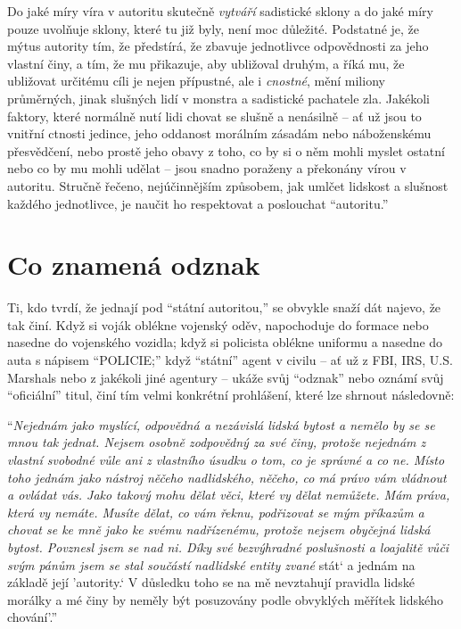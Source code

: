 \documentclass{book}
\begin{document}
Do jaké míry víra v autoritu skutečně \emph{vytváří} sadistické sklony a do jaké míry pouze uvolňuje sklony, které tu již byly, není moc důležité. Podstatné je, že mýtus autority tím, že předstírá, že zbavuje jednotlivce odpovědnosti za jeho vlastní činy, a tím, že mu přikazuje, aby ubližoval druhým, a říká mu, že ubližovat určitému cíli je nejen přípustné, ale i \emph{cnostné}, mění miliony průměrných, jinak slušných lidí v monstra a sadistické pachatele zla. Jakékoli faktory, které normálně nutí lidi chovat se slušně a nenásilně -- ať už jsou to vnitřní ctnosti jedince, jeho oddanost morálním zásadám nebo náboženskému přesvědčení, nebo prostě jeho obavy z toho, co by si o něm mohli myslet ostatní nebo co by mu mohli udělat -- jsou snadno poraženy a překonány vírou v autoritu. Stručně řečeno, nejúčinnějším způsobem, jak umlčet lidskost a slušnost každého jednotlivce, je naučit ho respektovat a poslouchat \enquote{autoritu.}

\section{Co znamená odznak}

Ti, kdo tvrdí, že jednají pod \enquote{státní autoritou,} se obvykle snaží dát najevo, že tak činí. Když si voják oblékne vojenský oděv, napochoduje do formace nebo nasedne do vojenského vozidla; když si policista oblékne uniformu a nasedne do auta s nápisem \enquote{POLICIE;} když \enquote{státní} agent v civilu -- ať už z FBI, IRS, U.S. Marshals nebo z jakékoli jiné agentury -- ukáže svůj \enquote{odznak} nebo oznámí svůj \enquote{oficiální} titul, činí tím velmi konkrétní prohlášení, které lze shrnout následovně:

\enquote{\emph{Nejednám jako myslící, odpovědná a nezávislá lidská bytost a nemělo by se se mnou tak jednat. Nejsem osobně zodpovědný za své činy, protože nejednám z vlastní svobodné vůle ani z vlastního úsudku o tom, co je správné a co ne. Místo toho jednám jako nástroj něčeho nadlidského, něčeho, co má právo vám vládnout a ovládat vás. Jako takový mohu dělat věci, které vy dělat nemůžete. Mám práva, která vy nemáte. Musíte dělat, co vám řeknu, podřizovat se mým příkazům a chovat se ke mně jako ke svému nadřízenému, protože nejsem obyčejná lidská bytost. Povznesl jsem se nad ni. Díky své bezvýhradné poslušnosti a loajalitě vůči svým pánům jsem se stal součástí nadlidské entity zvané }stát\enquote{ a jednám na základě její }autority.\enquote{ V důsledku toho se na mě nevztahují pravidla lidské morálky a mé činy by neměly být posuzovány podle obvyklých měřítek lidského chování}.}
\end{document}
